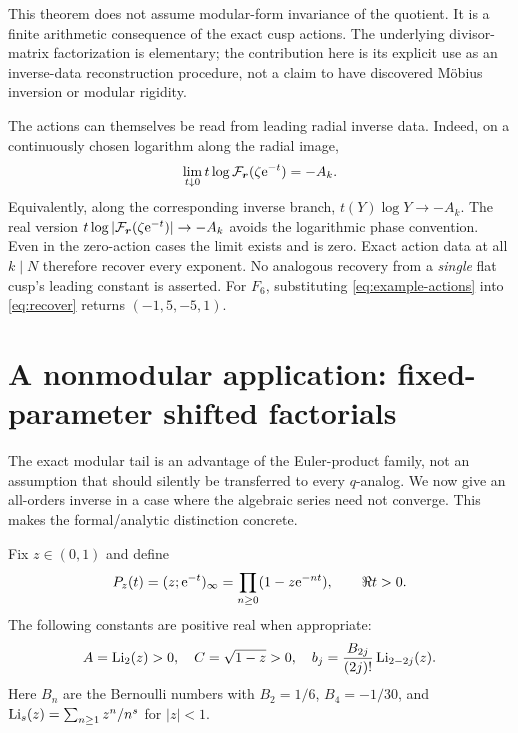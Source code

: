 \documentclass[11pt,a4paper]{article}
\numberwithin{equation}{section}
\theoremstyle{definition}\newtheorem{definition}[theorem]{Definition}
\theoremstyle{remark}\newtheorem{remark}[theorem]{Remark}
\newcommand{\vct}[1]{\boldsymbol{#1}}
\begin{document}
This theorem does not assume modular-form invariance of the quotient.
It is a finite arithmetic consequence of the exact cusp actions. The
underlying divisor-matrix factorization is elementary; the contribution
here is its explicit use as an inverse-data reconstruction procedure,
not a claim to have discovered M\"obius inversion or modular rigidity.

The actions can themselves be read from leading radial inverse data.
Indeed, on a continuously chosen logarithm along the radial image,
\begin{equation}\label{eq:inverse-action-data}
 \lim_{t\downarrow0} t\log\F_{\vct r}(\zeta\e^{-t})=-A_k.
\end{equation}
Equivalently, along the corresponding inverse branch,
$t(Y)\log Y\to-A_k$. The real version
$t\log|\F_{\vct r}(\zeta\e^{-t})|\to-A_k$ avoids the logarithmic
phase convention. Even in the zero-action cases the limit exists and
is zero. Exact action data at all $k\mid N$ therefore recover every
exponent. No analogous recovery from a \emph{single} flat cusp's leading
constant is asserted. For $F_6$, substituting \eqref{eq:example-actions}
into \eqref{eq:recover} returns $(-1,5,-5,1)$.

\section{A nonmodular application: fixed-parameter shifted factorials}
\label{sec:shifted}
The exact modular tail is an advantage of the Euler-product family, not
an assumption that should silently be transferred to every $q$-analog.
We now give an all-orders inverse in a case where the algebraic series
need not converge. This makes the formal/analytic distinction concrete.

Fix $z\in(0,1)$ and define
\[
 P_z(t)=(z;\mathrm e^{-t})_\infty=\prod_{n\ge0}(1-z\mathrm e^{-nt}),\qquad \Re t>0.
\]
The following constants are positive real when appropriate:
\[
 A=\operatorname{Li}_2(z)>0,\quad C=\sqrt{1-z}>0,\quad
 b_j=\frac{B_{2j}}{(2j)!}\operatorname{Li}_{2-2j}(z).
\]
Here $B_n$ are the Bernoulli numbers with $B_2=1/6$, $B_4=-1/30$,
and $\operatorname{Li}_s(z)=\sum_{n\ge1}z^n/n^s$ for $|z|<1$.
\end{document}
